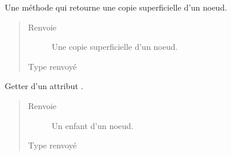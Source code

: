 \documentclass[letterpaper,10pt,french]{sphinxmanual}
\begin{document}
\begin{fulllineitems}
\begin{fulllineitems}
\end{fulllineitems}


\begin{fulllineitems}
\label{\detokenize{index:StrategyTree.Repair.copy}}
Une méthode qui retourne une copie superficielle d’un noeud.
\begin{quote}\begin{description}
\item[{Renvoie}] \leavevmode
{} \textendash{} Une copie superficielle d’un noeud.

\item[{Type renvoyé}] \leavevmode
{\hyperref[\detokenize{index:StrategyTree.Repair}]{}}

\end{description}\end{quote}

\end{fulllineitems}


\begin{fulllineitems}
\label{\detokenize{index:StrategyTree.Repair.get_child}}
Getter d’un attribut .
\begin{quote}\begin{description}
\item[{Renvoie}] \leavevmode
{} \textendash{} Un enfant d’un noeud.

\item[{Type renvoyé}] \leavevmode
{\hyperref[\detokenize{index:StrategyTree.NodeST}]{}}

\end{description}\end{quote}

\end{fulllineitems}



\end{fulllineitems}
\end{document}
